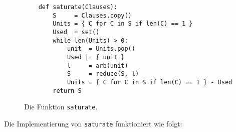 \begin{figure}[!ht]
  \centering
\begin{verbatim}
    def saturate(Clauses):
        S     = Clauses.copy()
        Units = { C for C in S if len(C) == 1 }
        Used  = set()
        while len(Units) > 0:
            unit  = Units.pop()
            Used |= { unit }
            l     = arb(unit)
            S     = reduce(S, l)
            Units = { C for C in S if len(C) == 1 } - Used        
        return S
\end{verbatim}
\vspace*{-0.3cm}
  \caption{Die Funktion \texttt{saturate}. }
  \label{fig:saturate}
\end{figure} 
Die Implementierung von \texttt{saturate} funktioniert wie folgt: 

